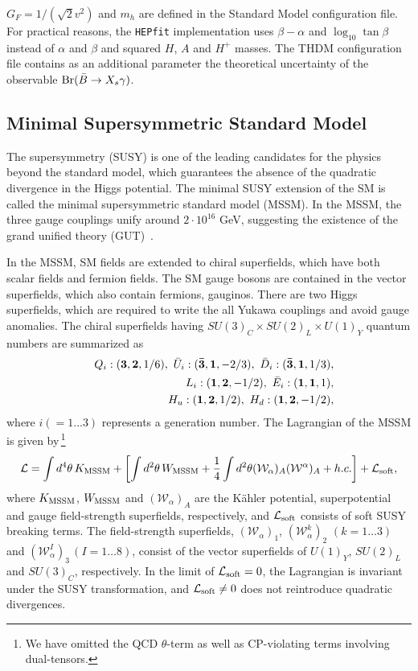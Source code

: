 \documentclass[preprint,3p,12pt]{elsarticle}
\newcommand{\HEPfit}{\texttt{HEPfit}\xspace}
\begin{document}
$G_F=1/(\sqrt{2} v^2)$ and $m_h$ are defined in the Standard Model configuration file. For practical reasons, the \HEPfit implementation uses $\beta-\alpha$ and $\log_{10}\tan\beta$ instead of $\alpha$ and $\beta$ and squared $H$, $A$ and $H^+$ masses. The THDM configuration file contains as an additional parameter the theoretical uncertainty of the observable ${\rm Br}(\bar{B}\to X_s\gamma)$.

\subsection{Minimal Supersymmetric Standard Model}
\label{sec:MSSM}

The supersymmetry (SUSY) is one of the leading candidates for the physics beyond the standard model, which guarantees the absence of the quadratic divergence in the Higgs potential. The minimal SUSY extension of the SM is called the minimal supersymmetric standard model (MSSM). In the MSSM, the three gauge couplings unify around $2\cdot 10^{16}$ GeV, suggesting the existence of the grand unified theory (GUT)~\cite{Georgi:1974sy, Pati:1974yy}.
 
In the MSSM, SM fields are extended to chiral superfields, which have both scalar fields and fermion fields. The SM gauge bosons are contained in the vector superfields, which also contain fermions, gauginos. There are two Higgs superfields, which are required to write the all %
Yukawa couplings and avoid gauge anomalies. The chiral superfields having $SU(3)_C \times SU(2)_L \times U(1)_Y$ quantum numbers are summarized as 
\begin{eqnarray}
&& Q_i: ({\bf 3}, {\bf 2},1/6), \ \bar U_i: ({\bf \bar 3}, {\bf 1}, -2/3), \  \bar D_i: ({\bf \bar 3}, {\bf 1}, 1/3),  \nonumber \\ 
&& L_i: ({\bf 1}, {\bf 2}, -1/2),  \ \bar E_i:({\bf 1},{\bf 1},1), \nonumber \\
&& H_u: ({\bf 1},{\bf 2},1/2), \ H_d:({\bf 1}, {\bf 2},-1/2),
\end{eqnarray}
where $i(=1 \dots 3)$ represents a generation number.
%
The Lagrangian of the MSSM is given by\,\footnote{
We have omitted the QCD $\theta$-term as well as CP-violating terms involving dual-tensors.
}
\begin{eqnarray}
\mathcal{L} = \int d^4 \theta \, K_{\rm MSSM}  + \left[ 
\int d^2 \theta \, W_{\rm MSSM}  + \frac{1}{4} \int d^2 \theta (\mathcal{W}_{\alpha})_A (\mathcal{W}^{\alpha})_A + h.c.
\right] + \mathcal{L}_{\rm soft},
\end{eqnarray}
where $K_{\rm MSSM}$, $W_{\rm MSSM}$ and $(\mathcal{W}_{\alpha})_A$
are the K{\" a}hler potential, superpotential and gauge field-strength superfields, respectively, 
and $\mathcal{L}_{\rm soft}$ consists of soft SUSY breaking terms. 
The field-strength superfields, $(\mathcal{W}_{\alpha})_1$, $(\mathcal{W}_{\alpha}^k)_2$ $(k=1\dots 3)$ and $(\mathcal{W}_{\alpha}^I)_3$\,$(I=1\dots 8)$, consist of the vector superfields of $U(1)_Y$, $SU(2)_L$ and $SU(3)_C$, respectively. 
In the limit of $\mathcal{L}_{\rm soft}=0$, the Lagrangian is invariant under the SUSY transformation, 
and $\mathcal{L}_{\rm soft} \neq 0$ does not reintroduce quadratic divergences.
%
\end{document}
